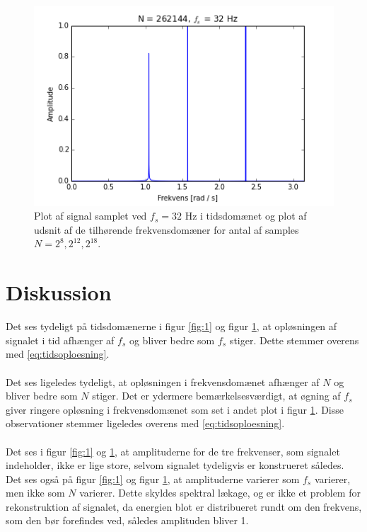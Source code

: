 \begin{figure}[H]
\begin{minipage}{0.49\textwidth}
\includegraphics[width=\textwidth]{figures/frekvensanalyse/freq_32hz_N262144.png}
\end{minipage}
\caption{Plot af signal samplet ved $f_s=32$ Hz i tidsdomænet og plot af udsnit af de tilhørende frekvensdomæner for antal af samples $N=2^8, 2^{12}, 2^{18}$.}
\label{fig:2}
\end{figure}

\section{Diskussion}
Det ses tydeligt på tidsdomænerne i figur \ref{fig:1} og figur \ref{fig:2}, at opløsningen af signalet i tid afhænger af $f_s$ og bliver bedre som $f_s$ stiger. Dette stemmer overens med \eqref{eq:tidsoploesning}.
\\ \\
Det ses ligeledes tydeligt, at opløsningen i frekvensdomænet afhænger af $N$ og bliver bedre som $N$ stiger. Det er ydermere bemærkelsesværdigt, at øgning af $f_s$ giver ringere opløsning i frekvensdomænet som set i andet plot i figur \ref{fig:2}. Disse observationer stemmer ligeledes overens med \eqref{eq:tidsoploesning}.
\\ \\
Det ses i figur \ref{fig:1} og \ref{fig:2}, at amplituderne for de tre frekvenser, som signalet indeholder, ikke er lige store, selvom signalet tydeligvis er konstrueret således. Det ses også på figur \ref{fig:1} og figur \ref{fig:2}, at amplituderne varierer som $f_s$ varierer, men ikke som $N$ varierer. Dette skyldes spektral lækage, og er ikke et problem for rekonstruktion af signalet, da energien blot er distribueret rundt om den frekvens, som den bør forefindes ved, således amplituden bliver 1.

